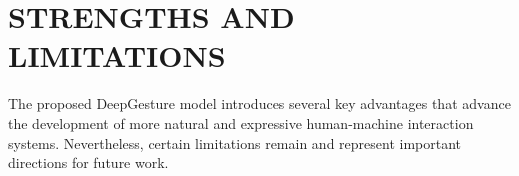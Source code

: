 
%
%
%
%
%
%
%


\section{STRENGTHS AND LIMITATIONS}

The proposed DeepGesture model introduces several key advantages that advance the development of more natural and expressive human-machine interaction systems. Nevertheless, certain limitations remain and represent important directions for future work.

